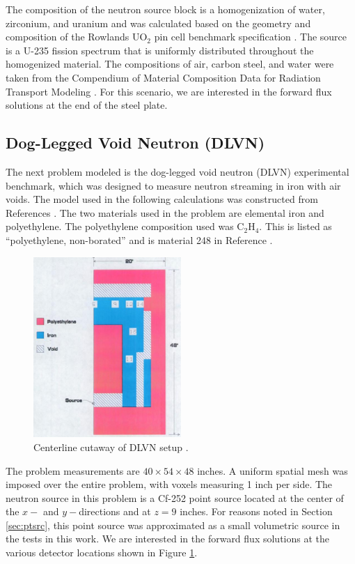 The composition of the neutron source block is a homogenization of water, zirconium,
and uranium and was calculated based on the geometry and composition of the Rowlands
UO$_2$ pin cell benchmark specification \cite{pincell}. The source is a U-235 fission 
spectrum that is uniformly distributed throughout the homogenized material. The
compositions of air, carbon steel, and water were taken from the Compendium of 
Material Composition Data for Radiation Transport Modeling \cite{pnnl}. For this scenario,
we are interested in the forward flux solutions at the end of the steel plate.

\FloatBarrier
\subsection{Dog-Legged Void Neutron (DLVN)}

The next problem modeled is the dog-legged void neutron (DLVN) experimental benchmark,
which was designed to measure neutron streaming in iron with air voids. The model used
in the following calculations was constructed from References 
\cite{sw-dlvn,j-dlvn,dlvn1991}. The two materials used in the problem are elemental 
iron and polyethylene. The polyethylene composition used was C$_2$H$_4$. This is 
listed as ``polyethylene, non-borated'' and is material 248 in Reference \cite{pnnl}. 

\begin{figure}[!htb]
\centering
\includegraphics[width=0.5\textwidth]{img/dlvn.png}
\caption{Centerline cutaway of DLVN setup \cite{sw-dlvn}.}
\label{dlvn}
\end{figure}

The problem measurements are $40\times54\times48$ inches. A uniform spatial mesh was 
imposed over the entire problem, with voxels measuring 1 inch per side. The neutron
source in this problem is a Cf-252 point source located at the center of the $x-$ and
$y-$directions and at $z = 9$ inches. For reasons noted in Section \ref{sec:ptsrc},
this point source was approximated as a small volumetric source in the tests in this 
work. We are interested in the forward flux solutions at the various detector locations
shown in Figure \ref{dlvn}.

